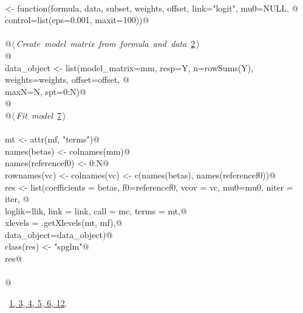 \documentclass[reqno]{amsart}
\renewcommand{\NWlink}[2]{\hyperlink{#1}{#2}}
\begin{document}
\begin{flushleft}
\begin{list}{}{}
\mbox{}\verb@@\\
\mbox{}\verb@spglm <- function(formula, data, subset, weights, offset, link="logit", mu0=NULL, @\\
\mbox{}\verb@                  control=list(eps=0.001, maxit=100)){@\\
\mbox{}\verb@@\\
\mbox{}\verb@    @\hbox{$\langle\,${\itshape Create model matrix from formula and data}\nobreak\ {\footnotesize \NWlink{nuweb2}{2}}$\,\rangle$}\verb@@\\
\mbox{}\verb@    @\\
\mbox{}\verb@    data_object <- list(model_matrix=mm, resp=Y, n=rowSums(Y), weights=weights, offset=offset, @\\
\mbox{}\verb@                        maxN=N, spt=0:N)@\\
\mbox{}\verb@    @\\
\mbox{}\verb@    @\hbox{$\langle\,${\itshape Fit model}\nobreak\ {\footnotesize \NWlink{nuweb7}{7}}$\,\rangle$}\verb@@\\
\mbox{}\verb@@\\
\mbox{}\verb@    mt <- attr(mf, "terms")@\\
\mbox{}\verb@    names(betas) <- colnames(mm)@\\
\mbox{}\verb@    names(referencef0) <- 0:N@\\
\mbox{}\verb@    rownames(vc) <- colnames(vc) <- c(names(betas), names(referencef0))@\\
\mbox{}\verb@    res <- list(coefficients = betas, f0=referencef0, vcov = vc, mu0=mu0, niter = iter, @\\
\mbox{}\verb@                loglik=llik, link = link, call = mc, terms = mt,@\\
\mbox{}\verb@                xlevels = .getXlevels(mt, mf),@\\
\mbox{}\verb@                data_object=data_object)@\\
\mbox{}\verb@    class(res) <- "spglm"@\\
\mbox{}\verb@    res@\\
\mbox{}\verb@@\\
\mbox{}\verb@}@\\
\mbox{}\verb@@{\NWsep}
\end{list}
\vspace{-1.5ex}
\footnotesize
\begin{list}{}{\setlength{\itemsep}{-\parsep}\setlength{\itemindent}{-\leftmargin}}
\item \NWtxtFileDefBy\ \NWlink{nuweb1}{1}\NWlink{nuweb3}{, 3}\NWlink{nuweb4}{, 4}\NWlink{nuweb5}{, 5}\NWlink{nuweb6}{, 6}\NWlink{nuweb12}{, 12}.

\item{}
\end{list}
\vspace{4ex}
\end{flushleft}
\end{document}
